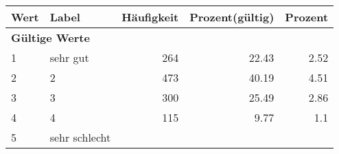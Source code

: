      \begin{longtable}{lXrrr}
     \toprule
     \textbf{Wert} & \textbf{Label} & \textbf{Häufigkeit} & \textbf{Prozent(gültig)} & \textbf{Prozent} \\
     \endhead
     \midrule
     \multicolumn{5}{l}{\textbf{Gültige Werte}}\\

     1 &
     \multicolumn{1}{X}{ sehr gut   } &


       \num{264} &
       \num[round-mode=places,round-precision=2]{22.43} &
         \num[round-mode=places,round-precision=2]{2.52} \\

     2 &
     \multicolumn{1}{X}{ 2   } &


       \num{473} &
       \num[round-mode=places,round-precision=2]{40.19} &
         \num[round-mode=places,round-precision=2]{4.51} \\

     3 &
     \multicolumn{1}{X}{ 3   } &


       \num{300} &
       \num[round-mode=places,round-precision=2]{25.49} &
         \num[round-mode=places,round-precision=2]{2.86} \\

     4 &
     \multicolumn{1}{X}{ 4   } &


       \num{115} &
       \num[round-mode=places,round-precision=2]{9.77} &
         \num[round-mode=places,round-precision=2]{1.1} \\

     5 &
     \multicolumn{1}{X}{ sehr schlecht   } &



\end{longtable}
